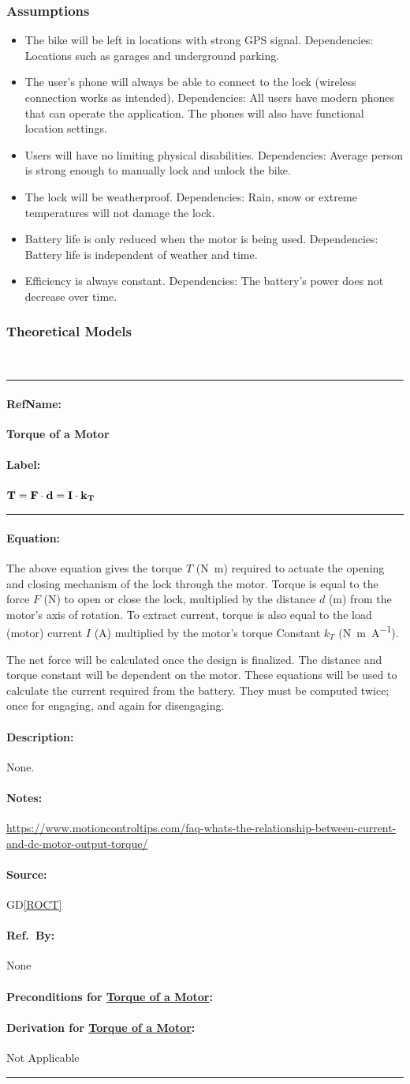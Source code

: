 \documentclass[12pt]{article}
\newcommand{\dref}[1]{GD\ref{#1}}
\newcommand{\deftheory}[9][Not Applicable]
{
\newpage
\noindent \rule{\textwidth}{0.5mm}

\paragraph{RefName: } \textbf{#2} \phantomsection 
\label{#2}

\paragraph{Label:} #3

\noindent \rule{\textwidth}{0.5mm}

\paragraph{Equation:}

#4

\paragraph{Description:}

#5

\paragraph{Notes:}

#6

\paragraph{Source:}

#7

\paragraph{Ref.\ By:}

#8

\paragraph{Preconditions for \hyperref[#2]{#2}:}
\label{#2_precond}

#9

\paragraph{Derivation for \hyperref[#2]{#2}:}
\label{#2_deriv}

#1

\noindent \rule{\textwidth}{0.5mm}

}
\begin{document}
\subsubsection{Assumptions} \label{sec_assumpt}

\begin{itemize}

\item The bike will be left in locations with strong GPS signal.
Dependencies: Locations such as garages and underground parking. 
\item The user’s phone will always be able to connect to the lock (wireless connection works as intended).
Dependencies: All users have modern phones that can operate the application. The phones will also have functional location settings.  
\item Users will have no limiting physical disabilities.
Dependencies: Average person is strong enough to manually lock and unlock the bike.
\item The lock will be weatherproof.
Dependencies: Rain, snow or extreme temperatures will not damage the lock. 
\item Battery life is only reduced when the motor is being used.
Dependencies: Battery life is independent of weather and time.
\item Efficiency is always constant.
Dependencies: The battery's power does not decrease over time.

\end{itemize}

\subsubsection{Theoretical Models}\label{sec_theoretical}

~\newline

\noindent
\deftheory
{Torque of a Motor}
{
  ${\bf T = F \cdot d} = {\bf I  \cdot  k_T}$
}

{
The above equation gives the torque $T$ (\si{\newton\metre}) required to actuate the opening and closing mechanism of the lock through the motor. Torque is equal to the force $F$ (\si{\newton}) to open or close the lock, multiplied by the distance $d$ (\si{\metre}) from the motor's axis of rotation. To extract current, torque is also equal to the load (motor) current $I$ (\si{\ampere}) multiplied by the motor's torque Constant $k_T$ (\si{\newton\metre\per\ampere}).  

The net force will be calculated once the design is finalized. The distance and torque constant will be dependent on the motor. These equations will be used to calculate the current required from the battery. They must be computed twice; once for engaging, and again for disengaging. 
}
{
None.
}
{
  \url{https://www.motioncontroltips.com/faq-whats-the-relationship-between-current-and-dc-motor-output-torque/ }
}
{
  \dref{ROCT}
}
{
None
}
{}
\end{document}
